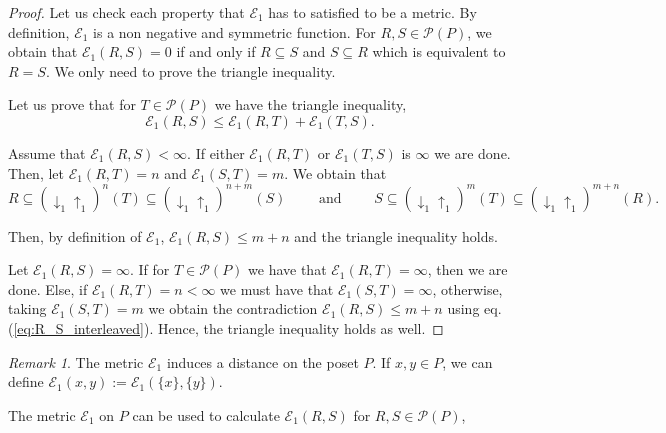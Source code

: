 \documentclass{article}[12pt]
\theoremstyle{exampstyle}
\theoremstyle{remark}
\newtheorem*{remark}{Remark}
\newcommand{\E}{\mathcal{E}}
\renewcommand{\P}{\mathcal{P}}
\newcommand{\updown}[1][]{\downarrow_{#1} \uparrow_{#1}}
\begin{document}
\begin{proof}
    Let us check each property that $\E_1$ has to satisfied to be a metric. By definition, $\E_1$ is a non negative and symmetric function. For $R,S \in \P(P)$, we obtain that $\E_1(R,S) = 0$ if and only if $R \subseteq S$ and $S \subseteq R$ which is equivalent to $R = S$. We only need to prove the triangle inequality.

    Let us prove that for $T \in \P(P)$ we have the triangle inequality,
        \begin{equation*}
            \E_1(R,S) \leq \E_1(R,T) + \E_1(T,S).
            \label{eq:triangle_in}
        \end{equation*}

    Assume that $\E_1(R,S) < \infty$. If either $\E_1(R,T)$ or $\E_1(T,S) $ is $\infty$ we are done. Then, let $\E_1(R,T) = n$ and $\E_1(S,T) = m$. We obtain that 
       \begin{equation}
        R \subseteq (\updown[1])^n(T) \subseteq (\updown[1])^{n+m}(S) \qquad \text{ and } \qquad S \subseteq (\updown[1])^m(T) \subseteq (\updown[1])^{m+n}(R).
        \label{eq:R_S_interleaved}
    \end{equation}

    Then, by definition of $\E_1$, $\E_1(R,S) \leq m+n$ and the triangle inequality holds. 
        
    Let $\E_1(R,S) = \infty$. If for $T \in \P(P)$ we have that $\E_1(R,T) = \infty$, then we are done. Else, if $\E_1(R,T) = n < \infty$ we must have that $\E_1(S,T) = \infty$, otherwise, taking $\E_1(S,T) = m$ we obtain the contradiction $\E_1(R,S) \leq m+n$ using eq. (\ref{eq:R_S_interleaved}). Hence, the triangle inequality holds as well.
\end{proof}

\begin{remark}
    The metric $\E_1$ induces a distance on the poset $P$. If $x,y \in P$, we can define  $\E_1(x,y) := \E_1(\{x\},\{y\})$.
\end{remark}

The metric $\E_1$ on $P$ can be used to calculate $\E_1(R,S)$ for $R,S \in \P(P)$,
\end{document}
